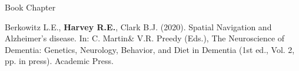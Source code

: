 \begin{cventries}
\cventry
    {Book Chapter} %
    {} %
    {} %
    {} %
    {
      \begin{cvitems} %
      \setlength\itemsep{0.5em}
          \item {Berkowitz L.E., \textbf{Harvey R.E.}, Clark B.J. (2020). Spatial Navigation and Alzheimer’s disease. In: C. Martin\& V.R. Preedy (Eds.), The Neuroscience of Dementia: Genetics, Neurology, Behavior, and Diet in Dementia (1st ed., Vol. 2, pp. in press). Academic Press.}
      \end{cvitems}
    }
\end{cventries}    
    
